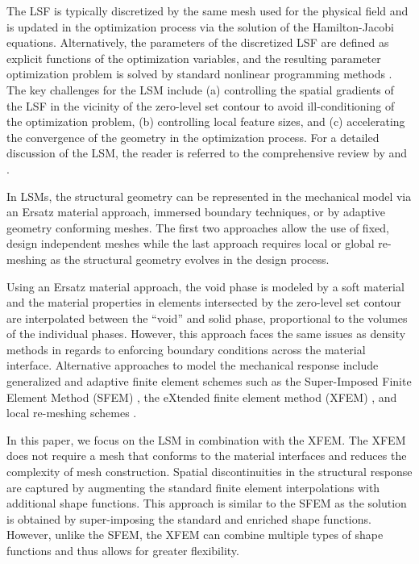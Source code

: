 The LSF is typically discretized by the same mesh used for the physical field and is updated in the optimization process via the solution of the Hamilton-Jacobi equations. Alternatively, the parameters of the discretized LSF are defined as explicit functions of the optimization variables, and the resulting parameter optimization problem is solved by standard nonlinear programming methods \citep{DML+:13}. The key challenges for the LSM include (a) controlling the spatial gradients of the LSF in the vicinity of the zero-level set contour to avoid ill-conditioning of the optimization problem, (b) controlling local feature sizes, and (c) accelerating the convergence of the geometry in the optimization process. For a detailed discussion of the LSM, the reader is referred to the comprehensive review by \citet{DML+:13} and \citet{GP:13}.

In LSMs, the structural geometry can be represented in the mechanical model via an Ersatz material approach, immersed boundary techniques, or by adaptive geometry conforming meshes. The first two approaches allow the use of fixed, design independent meshes while the last approach requires local or global re-meshing as the structural geometry evolves in the design process.

Using an Ersatz material approach, the void phase is modeled by a soft material and the material properties in elements intersected by the zero-level set contour are interpolated between the ``void'' and solid phase, proportional to the volumes of the individual phases. However, this approach faces the same issues as density methods in regards to enforcing boundary conditions across the material interface. Alternative approaches to model the mechanical response include generalized and adaptive finite element schemes such as the Super-Imposed Finite Element Method (SFEM) \citep{WW:06}, the eXtended finite element method (XFEM) \citep{MD:07,WWX:10,KM:12}, and local re-meshing schemes \citep{YNK+:11}.

In this paper, we focus on the LSM in combination with the XFEM. The XFEM does not require a mesh that conforms to the material interfaces and reduces the complexity of mesh construction. Spatial discontinuities in the structural response are captured by augmenting the standard finite element interpolations with additional shape functions. This approach is similar to the SFEM \citep{WW:06} as the solution is obtained by super-imposing the standard and enriched shape functions. However, unlike the SFEM, the XFEM can combine multiple types of shape functions and thus allows for greater flexibility.

